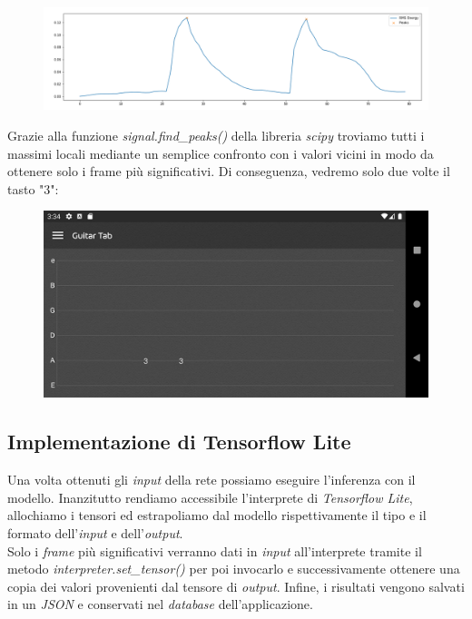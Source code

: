\begin{figure}[H]
	\centering
	\includegraphics[scale=0.35]{./images/img27.png}
\end{figure}
Grazie alla funzione \textit{signal.find\_peaks()} della libreria \textit{scipy} troviamo tutti i massimi locali mediante un semplice confronto con i valori vicini in modo da ottenere solo i frame più significativi.
\vspace*{2ex}
\vspace*{2ex}
Di conseguenza, vedremo solo due volte il tasto "3":
\begin{figure}[H]
	\centering
	\includegraphics[scale=0.28]{./images/img24.png}
\end{figure}
\subsection{Implementazione di Tensorflow Lite}
Una volta ottenuti gli \textit{input} della rete possiamo eseguire l'inferenza con il modello. Inanzitutto rendiamo accessibile l'interprete di \textit{Tensorflow Lite}, allochiamo i tensori ed estrapoliamo dal modello rispettivamente il tipo e il formato dell'\textit{input} e dell'\textit{output}.\\ Solo i \textit{frame} più significativi verranno dati in \textit{input} all'interprete tramite il metodo \textit{interpreter.set\_tensor()} per poi invocarlo e successivamente ottenere una copia dei valori provenienti dal tensore di \textit{output}. Infine, i risultati vengono salvati in un \textit{JSON} e conservati nel \textit{database} dell'applicazione.
\vspace*{2ex}
\vspace*{2ex}
